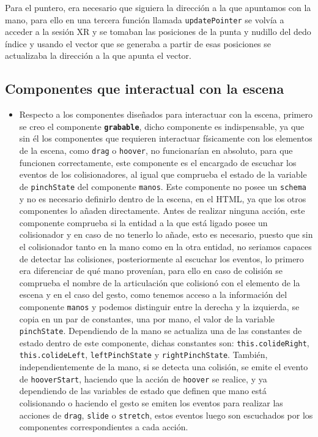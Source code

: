 \documentclass[a4paper, 12pt]{book}
\begin{document}
Para el puntero, era necesario que siguiera la dirección a la que apuntamos con la mano, para ello en una tercera función llamada \texttt{updatePointer} se volvía a acceder a la sesión XR y se tomaban las posiciones de la punta y nudillo del dedo índice y usando el vector que se generaba a partir de esas posiciones se actualizaba la dirección a la que apunta el vector.

\subsection{Componentes que interactual con la escena}
\label{subsec:componentes-interactivos}
\begin{itemize}
  \item Respecto a los componentes diseñados para interactuar con la escena, primero se creo el componente \textbf{\texttt{grabable}}, dicho componente es indispensable, ya que sin él los componentes que requieren interactuar físicamente con los elementos de la escena, como \texttt{drag} o \texttt{hoover}, no funcionarían en absoluto, para que funcionen correctamente, este componente es el encargado de escuchar los eventos de los colisionadores, al igual que comprueba el estado de la variable de \texttt{pinchState} del componente \texttt{manos}. Este componente no posee un \texttt{schema} y no es necesario definirlo dentro de la escena, en el HTML, ya que los otros componentes lo añaden directamente. Antes de realizar ninguna acción, este componente comprueba si la entidad a la que está ligado posee un colisionador y en caso de no tenerlo lo añade, esto es necesario, puesto que sin el colisionador tanto en la mano como en la otra entidad, no seriamos capaces de detectar las colisiones, posteriormente al escuchar los eventos, lo primero era diferenciar de qué mano provenían, para ello en caso de colisión se comprueba el nombre de la articulación que colisionó con el elemento de la escena y en el caso del gesto, como tenemos acceso a la información del componente \texttt{manos} y podemos distinguir entre la derecha y la izquierda, se copia en un par de constantes, una por mano, el valor de la variable \texttt{pinchState}. Dependiendo de la mano se actualiza una de las constantes de estado dentro de este componente, dichas constantes son: \texttt{this.colideRight}, \texttt{this.colideLeft}, \texttt{leftPinchState} y \texttt{rightPinchState}. También, independientemente de la mano, si se detecta una colisión,
se emite el evento de \texttt{hooverStart}, haciendo que la acción de \texttt{hoover} se realice, y ya dependiendo de las variables de estado que definen que mano está colisionando o haciendo el gesto se emiten los eventos para realizar las acciones de \texttt{drag}, \texttt{slide} o \texttt{stretch}, estos eventos luego son escuchados por los componentes correspondientes a cada acción.


\end{itemize}
\end{document}
